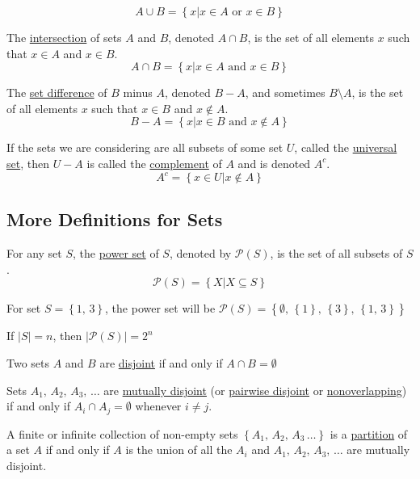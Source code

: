 $$A\cup B = \left\{x | x \in A \text{ or } x\in B\right\}$$

The \underline{intersection} of sets $A$ and $B$, denoted $A\cap B$, is the set of all elements $x$ such that $x\in A$ and $x\in B$.
$$A\cap B = \left\{x | x\in A \text{ and } x\in B\right\}$$

The \underline{set difference} of $B$ minus $A$, denoted $B-A$, and sometimes $B \setminus A$, is the set of all elements $x$ such that $x\in B$ and $x\notin A$.
$$B - A = \left\{x | x\in B \text{ and } x\notin A\right\}$$

If the sets we are considering are all subsets of some set $U$, called the \underline{universal set}, then $U - A$ is called the \underline{complement} of $A$ and is denoted $A^c$.
$$A^c = \left\{x\in U | x\notin A\right\}$$

\subsection{More Definitions for Sets}
\begin{definition}
    For any set $S$, the \underline{power set} of $S$, denoted by $\mathcal{P}(S)$, is the set of all subsets of $S$.
    $$\mathcal{P}(S) = \left\{X | X\subseteq S\right\}$$
\end{definition}

\begin{example}
    For set $S = \left\{1,\,3\right\}$, the power set will be $\mathcal{P}(S) = \left\{\emptyset,\,\left\{1\right\},\,\left\{3\right\},\,\left\{1,\,3\right\}\right\}$
\end{example}

If $|S| = n$, then $|\mathcal{P}(S)| = 2^n$

\begin{definition}
    Two sets $A$ and $B$ are \underline{disjoint} if and only if $A\cap B = \emptyset$
\end{definition}

\begin{definition}
    Sets $A_1,\,A_2,\,A_3,\,\dots$ are \underline{mutually disjoint} (or \underline{pairwise disjoint} or \underline{nonoverlapping}) if and only if $A_i \cap A_j = \emptyset$ whenever $i\neq j$.
\end{definition}

\begin{definition}
    A finite or infinite collection of non-empty sets $\left\{A_1,\,A_2,\,A_3\,\dots\right\}$ is a \underline{partition} of a set $A$ if and only if $A$ is the union of all the $A_i$ and $A_1,\,A_2,\,A_3,\,\dots$ are mutually disjoint.
\end{definition}

